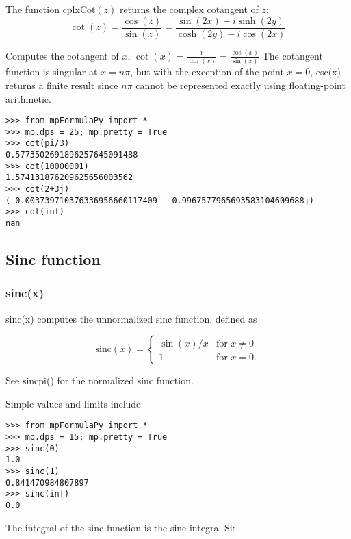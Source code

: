 \vspace{0.3cm}
The function \textsf{cplxCot$(z)$} returns the complex cotangent of $z$: 
\begin{equation}
	\cot(z) =\frac{\cos(z)}{\sin(z)} = \frac{\sin(2x)-i \sinh(2y)}{\cosh(2y)-i \cos(2x)}
\end{equation}


Computes the cotangent of $x$, $\cot(x)=\frac{1}{\tan(x)}=\frac{\cos(x)}{\sin(x)}$ The cotangent function is singular at $x=n \pi$, but with the exception of the point $x=0$, csc(x) returns a finite result since $n \pi$ cannot be represented exactly using floating-point arithmetic.

\begin{lstlisting}
>>> from mpFormulaPy import *
>>> mp.dps = 25; mp.pretty = True
>>> cot(pi/3)
0.5773502691896257645091488
>>> cot(10000001)
1.574131876209625656003562
>>> cot(2+3j)
(-0.003739710376336956660117409 - 0.9967577965693583104609688j)
>>> cot(inf)
nan
\end{lstlisting}

\newpage



\subsection{Sinc function}

\subsubsection{sinc(x)}
sinc(x) computes the unnormalized sinc function, defined as

\begin{equation}
	\text{sinc}(x)=\begin{cases}
		\sin(x)/x & \text{for }x \ne 0\\
		1 & \text{for }x=0.
	\end{cases}
\end{equation}


See sincpi() for the normalized sinc function.

Simple values and limits include

\begin{lstlisting}
>>> from mpFormulaPy import *
>>> mp.dps = 15; mp.pretty = True
>>> sinc(0)
1.0
>>> sinc(1)
0.841470984807897
>>> sinc(inf)
0.0
\end{lstlisting}

The integral of the sinc function is the sine integral Si:

